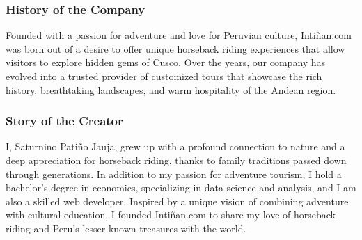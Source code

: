 \documentclass[12pt]{beamer}
\begin{document}
	\begin{frame}
		\frametitle{History of the Company}
		\begin{tcolorbox}[frogbox,title=Intiñan.com,fonttitle=\bfseries]
			Founded with a passion for adventure and love for Peruvian culture, Intiñan.com was born out of a desire to offer unique horseback riding experiences that allow visitors to explore hidden gems of Cusco. Over the years, our company has evolved into a trusted provider of customized tours that showcase the rich history, breathtaking landscapes, and warm hospitality of the Andean region.
		\end{tcolorbox}
	\end{frame}
	
	
	\begin{frame}
		\frametitle{Story of the Creator}
		
		\begin{tcolorbox}[ribbonbox,title=Saturnino Pati\~no Jauja, fonttitle=\bfseries]
				I, Saturnino Patiño Jauja, grew up with a profound connection to nature and a deep appreciation for horseback riding, thanks to family traditions passed down through generations. In addition to my passion for adventure tourism, I hold a bachelor's degree in economics, specializing in data science and analysis, and I am also a skilled web developer. Inspired by a unique vision of combining adventure with cultural education, I founded Intiñan.com to share my love of horseback riding and Peru's lesser-known treasures with the world.
		\end{tcolorbox}
	\end{frame}
	
\end{document}
